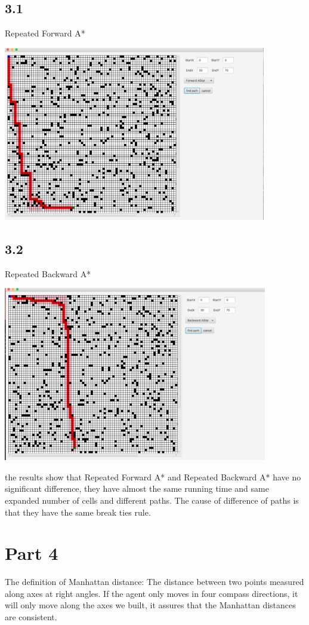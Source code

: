 \documentclass[12pt]{amsart}
\begin{document}
\subsection*{3.1}
Repeated Forward A*

\includegraphics[width=1\linewidth,height=3in]{forward_30.png}

\subsection*{3.2}
Repeated Backward A*

\includegraphics[width=1\linewidth,height=3in]{backward_30.png}

the results show that Repeated Forward A* and Repeated Backward A* have no significant difference, they have almost the same running time and same expanded number of cells and different paths. The cause of difference of paths is that they have the same break ties rule.
\section*{Part 4}
The definition of Manhattan distance: The distance between two points measured along axes at right angles. If the agent only moves in four compass directions, it will only move along the axes we built, it assures that the Manhattan distances are consistent.
\end{document}
